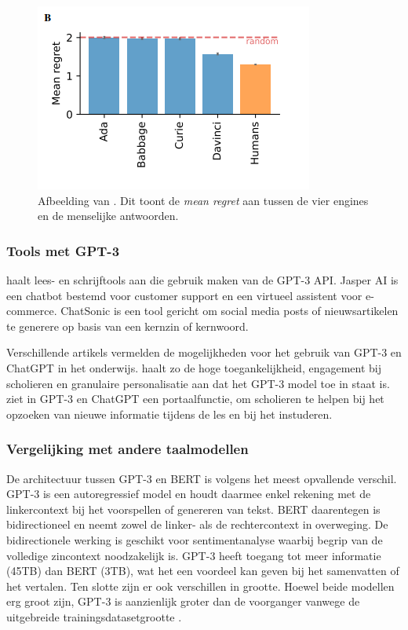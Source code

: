 \begin{figure}
	\begin{center}
		\includegraphics{img/chatgpt-engines-mean-regret.png}
		\caption{Afbeelding van \textcite{Binz2023}. Dit toont de \textit{mean regret} aan tussen de vier engines en de menselijke antwoorden.}
	\end{center}
\end{figure}

\subsubsection{Tools met GPT-3}

\textcite{Mottesi2023} haalt lees- en schrijftools aan die gebruik maken van de GPT-3 API. Jasper AI is een chatbot bestemd voor customer support en een virtueel assistent voor e-commerce. ChatSonic is een tool gericht om social media posts of nieuwsartikelen te generere op basis van een kernzin of kernwoord. 

Verschillende artikels vermelden de mogelijkheden voor het gebruik van GPT-3 en ChatGPT in het onderwijs. \textcite{Roose2023} haalt zo de hoge toegankelijkheid, engagement bij scholieren en granulaire personalisatie aan dat het GPT-3 model toe in staat is. \textcite{Garg2022} ziet in GPT-3 en ChatGPT een portaalfunctie, om scholieren te helpen bij het opzoeken van nieuwe informatie tijdens de les en bij het instuderen.

\subsubsection{Vergelijking met andere taalmodellen}

De architectuur tussen GPT-3 en BERT is volgens \textcite{Mottesi2023} het meest opvallende verschil. GPT-3 is een autoregressief model en houdt daarmee enkel rekening met de linkercontext bij het voorspellen of genereren van tekst. BERT daarentegen is bidirectioneel en neemt zowel de linker- als de rechtercontext in overweging. De bidirectionele werking is geschikt voor sentimentanalyse waarbij begrip van de volledige zincontext noodzakelijk is. GPT-3 heeft toegang tot meer informatie (45TB) dan BERT (3TB), wat het een voordeel kan geven bij het samenvatten of het vertalen. Ten slotte zijn er ook verschillen in grootte. Hoewel beide modellen erg groot zijn, GPT-3 is aanzienlijk groter dan de voorganger vanwege de uitgebreide trainingsdatasetgrootte \autocite{Brown2020}.


